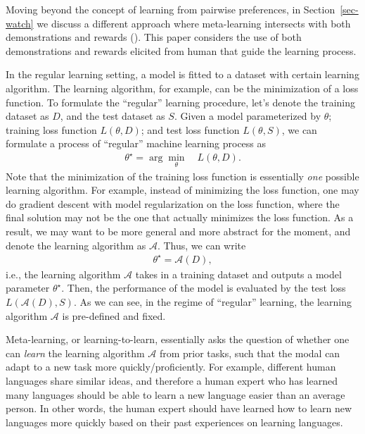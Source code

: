 \documentclass[
  letterpaper,
  numbers=noenddot,
  DIV=11,
  oneside]{scrreprt}
\theoremstyle{remark}
\begin{document}
Moving beyond the concept of learning from pairwise preferences, in
Section~\ref{sec-watch} we discuss a different approach where
meta-learning intersects with both demonstrations and rewards
(). This paper considers
the use of both demonstrations and rewards elicited from human that
guide the learning process.

In the regular learning setting, a model is fitted to a dataset with
certain learning algorithm. The learning algorithm, for example, can be
the minimization of a loss function. To formulate the ``regular''
learning procedure, let's denote the training dataset as \(D\), and the
test dataset as \(S\). Given a model parameterized by \(\theta\);
training loss function \(L(\theta, D)\); and test loss function
\(L(\theta, S)\), we can formulate a process of ``regular'' machine
learning process as \[\begin{aligned}
    \theta^\star = \arg\min_\theta\quad L(\theta, D).
\end{aligned}\] Note that the minimization of the training loss function
is essentially \emph{one} possible learning algorithm. For example,
instead of minimizing the loss function, one may do gradient descent
with model regularization on the loss function, where the final solution
may not be the one that actually minimizes the loss function. As a
result, we may want to be more general and more abstract for the moment,
and denote the learning algorithm as \(\mathcal{A}\). Thus, we can write
\[\begin{aligned}
    \theta^\star = \mathcal{A}(D),
\end{aligned}\] i.e., the learning algorithm \(\mathcal{A}\) takes in a
training dataset and outputs a model parameter \(\theta^\star\). Then,
the performance of the model is evaluated by the test loss
\(L(\mathcal{A}(D), S)\). As we can see, in the regime of ``regular''
learning, the learning algorithm \(\mathcal{A}\) is pre-defined and
fixed.

Meta-learning, or learning-to-learn, essentially asks the question of
whether one can \emph{learn} the learning algorithm \(\mathcal{A}\) from
prior tasks, such that the modal can adapt to a new task more
quickly/proficiently. For example, different human languages share
similar ideas, and therefore a human expert who has learned many
languages should be able to learn a new language easier than an average
person. In other words, the human expert should have learned how to
learn new languages more quickly based on their past experiences on
learning languages.
\end{document}
